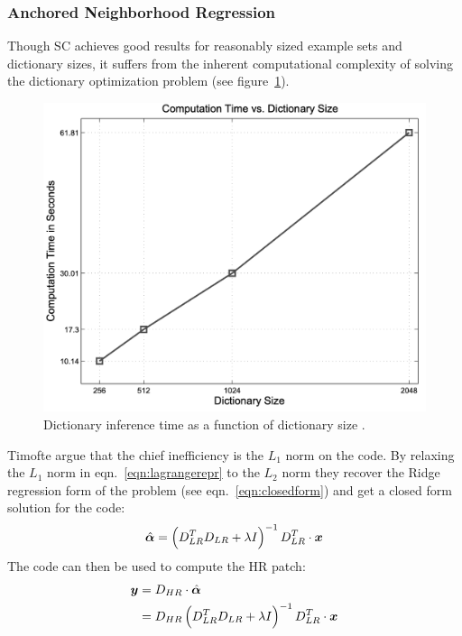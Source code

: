 \subsubsection{Anchored Neighborhood Regression}

Though SC achieves good results for reasonably sized example sets and dictionary sizes, it suffers from the inherent computational complexity of solving the dictionary optimization problem (see figure~\ref{fig:dictspeedspize}).
\begin{figure}[!htbp]
    \centering
    \includegraphics[width=\linewidth,keepaspectratio]{figures/classical/dictsizespeed.png}
    \caption{Dictionary inference time as a function of dictionary size \cite{yang2010}.}
    \label{fig:dictspeedspize}
\end{figure}
%
Timofte \etal \cite{Timofte} argue that the chief inefficiency is the \(L_1\) norm on the code.
%
By relaxing the \(L_1\) norm in eqn.~\eqref{eqn:lagrangerepr} to the \(L_2\) norm they recover the Ridge regression form of the problem (see eqn.~\eqref{eqn:closedform}) and get a closed form solution for the code:
\begin{equation}
    \hat{\bm{\alpha}} = \left( D_{LR}^T D_{LR} + \lambda I\right)^{-1}D_{LR}^T \cdot \bm{x}
\end{equation}
The code can then be used to compute the HR patch:
\begin{align}
    \bm{y} & = D_{HR} \cdot \hat{\bm{\alpha}}                                                               \\
        & = D_{HR} \left( D_{LR}^T D_{LR} + \lambda I\right)^{-1}D_{LR}^T \cdot\bm{x}\label{eqn:mappinglr}
\end{align}
